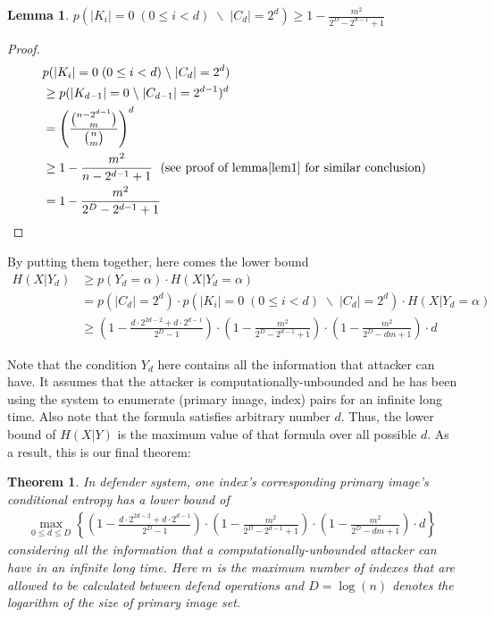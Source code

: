 \documentclass[10pt,a4paper]{article}
\newtheorem{mylemma}{Lemma}
\newtheorem{mytheorem}{Theorem}
\begin{document}
		\begin{mylemma}
			$p(|K_i| = 0	\; (0 \leq i < d) \; \backslash \; |C_d| = 2^d) 
				\geq 1-\frac{m^2}{2^D-2^{d-1}+1}$
		\end{mylemma}
		
		\begin{proof}
			\begin{align*}
				&p(|K_i| = 0	\; (0 \leq i < d) \; \backslash \; |C_d| = 2^d) \\\
					&\geq p(|K_{d-1}| = 0 \; \backslash \; |C_{d-1}| = 2^{d-1})^d\\
					&= \left(\frac{\binom{n-2^{d-1}}{m}}{\binom{n}{m}} \right)^d\\
					&\geq 1-\frac{m^2}{n-2^{d-1}+1}	\; \text{ (see proof of lemma\ref{lem1} for similar conclusion})\\
					&= 1-\frac{m^2}{2^D-2^{d-1}+1}
			\end{align*}
		\end{proof}
		
		By putting them together, here comes the lower bound
		\begin{align*}
			H(X | Y_d) &\geq p(Y_d = \alpha) \cdot H(X | Y_d = \alpha)\\
				&= p(|C_d| = 2^d) \cdot p(|K_i| = 0	\; (0 \leq i < d) \; \backslash \; |C_d| = 2^d) \cdot H(X | Y_d = \alpha)\\
				&\geq (1-\frac{d \cdot 2^{2d-2}+d \cdot 2^{d-1}}{2^D-1})
					\cdot (1-\frac{m^2}{2^D-2^{d-1}+1}) 
					\cdot (1-\frac{m^2}{2^D-dm+1}) \cdot d 
		\end{align*}
		
		Note that the condition $Y_d$ here contains all the
		information that attacker can have. It assumes that
		the attacker is computationally-unbounded and he has
		been using the system to enumerate (primary image, index) pairs
		for an infinite long time. Also note that the formula
		satisfies arbitrary number $d$. Thus, the lower bound
		of $H(X | Y)$ is the maximum value of that formula
		over all possible $d$.
		As a result, this is our final theorem:
		\begin{mytheorem}\label{thm1}
			In defender system, one index's corresponding
			primary image's conditional entropy has a lower bound of
			\begin{align*}
				\max_{0 \leq d \leq D} \left\{ (1-\frac{d \cdot 2^{2d-2}+d \cdot 2^{d-1}}{2^D-1})
					\cdot (1-\frac{m^2}{2^D-2^{d-1}+1}) 
					\cdot (1-\frac{m^2}{2^D-dm+1}) \cdot d \right\}
			\end{align*}
			considering all the information
			that a computationally-unbounded attacker can
			have in an infinite long time. Here $m$ is
			the maximum number of indexes that are allowed to be calculated
			between defend operations and $D = \log(n)$ denotes the
			logarithm of the size of primary image set.
		\end{mytheorem}
		
\end{document}
